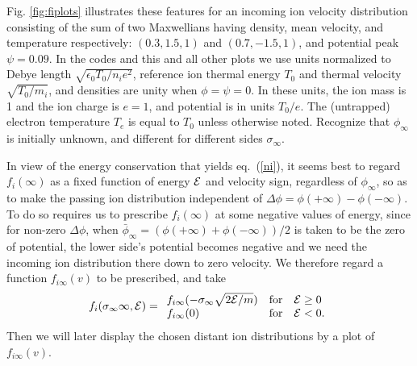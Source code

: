 \documentclass[pre]{revtex4-2}
\def\energy{{\cal E}}
\begin{document}
Fig. \ref{fig:fiplots} illustrates these features for an incoming ion
velocity distribution consisting of the sum of two Maxwellians having density,
mean velocity, and temperature respectively: $(0.3,1.5,1)$ and
$(0.7,-1.5,1)$, and potential peak $\psi=0.09$. In the codes and
this and all other plots we use units normalized to Debye length
$\sqrt{\epsilon_0T_0/n_ie^2}$, reference ion thermal energy $T_0$ and
thermal velocity $\sqrt{T_0/m_i}$, and densities are unity when
$\phi=\psi=0$. In these units, the ion mass is 1 and the ion charge is
$e=1$, and potential is in units $T_0/e$. The (untrapped) electron temperature
$T_e$ is equal to $T_0$ unless otherwise noted. Recognize that $\phi_\infty$ is
initially unknown, and different for different sides $\sigma_\infty$.


In view of the energy conservation that yields eq.\ (\ref{ni}), it seems
best to regard $f_{i}(\infty)$ as a fixed function of energy $\energy$
and velocity sign, regardless of $\phi_\infty$, so as to
make the passing ion distribution independent of
$\Delta\phi=\phi(+\infty)-\phi(-\infty)$. To do
so requires us to prescribe $f_i(\infty)$ at some negative values of
energy, since for non-zero $\Delta\phi$, when
$\bar\phi_{\infty}=(\phi(+\infty)+\phi(-\infty))/2$ is taken to be
the zero of potential, the lower side's potential becomes negative and
we need the incoming ion distribution there down to zero velocity. We
therefore regard a function $f_{i\infty}(v)$ to be prescribed, and take
\begin{equation} 
  \label{eq:fiinf}
  f_i(\sigma_\infty\infty,\energy)=
  \begin{array}{ll}f_{i\infty}(-\sigma_\infty\sqrt{2\energy/m})
  & \mbox{for}\quad \energy\ge 0\\
  f_{i\infty}(0) & \mbox{for}\quad \energy< 0.
  \end{array}
\end{equation}
Then we will later display the chosen distant ion distributions by a plot of
$f_{i\infty}(v)$.
\end{document}
